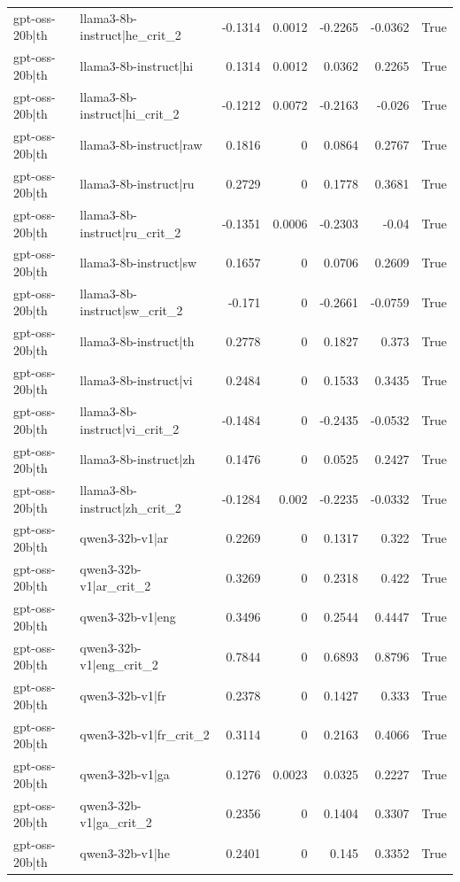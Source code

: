 \begin{table}
\begin{tabular}{l l r r r r l}
gpt-oss-20b|th & llama3-8b-instruct|he_crit_2 & -0.1314 & 0.0012 & -0.2265 & -0.0362 & True \\
gpt-oss-20b|th & llama3-8b-instruct|hi & 0.1314 & 0.0012 & 0.0362 & 0.2265 & True \\
gpt-oss-20b|th & llama3-8b-instruct|hi_crit_2 & -0.1212 & 0.0072 & -0.2163 & -0.026 & True \\
gpt-oss-20b|th & llama3-8b-instruct|raw & 0.1816 & 0 & 0.0864 & 0.2767 & True \\
gpt-oss-20b|th & llama3-8b-instruct|ru & 0.2729 & 0 & 0.1778 & 0.3681 & True \\
gpt-oss-20b|th & llama3-8b-instruct|ru_crit_2 & -0.1351 & 0.0006 & -0.2303 & -0.04 & True \\
gpt-oss-20b|th & llama3-8b-instruct|sw & 0.1657 & 0 & 0.0706 & 0.2609 & True \\
gpt-oss-20b|th & llama3-8b-instruct|sw_crit_2 & -0.171 & 0 & -0.2661 & -0.0759 & True \\
gpt-oss-20b|th & llama3-8b-instruct|th & 0.2778 & 0 & 0.1827 & 0.373 & True \\
gpt-oss-20b|th & llama3-8b-instruct|vi & 0.2484 & 0 & 0.1533 & 0.3435 & True \\
gpt-oss-20b|th & llama3-8b-instruct|vi_crit_2 & -0.1484 & 0 & -0.2435 & -0.0532 & True \\
gpt-oss-20b|th & llama3-8b-instruct|zh & 0.1476 & 0 & 0.0525 & 0.2427 & True \\
gpt-oss-20b|th & llama3-8b-instruct|zh_crit_2 & -0.1284 & 0.002 & -0.2235 & -0.0332 & True \\
gpt-oss-20b|th & qwen3-32b-v1|ar & 0.2269 & 0 & 0.1317 & 0.322 & True \\
gpt-oss-20b|th & qwen3-32b-v1|ar_crit_2 & 0.3269 & 0 & 0.2318 & 0.422 & True \\
gpt-oss-20b|th & qwen3-32b-v1|eng & 0.3496 & 0 & 0.2544 & 0.4447 & True \\
gpt-oss-20b|th & qwen3-32b-v1|eng_crit_2 & 0.7844 & 0 & 0.6893 & 0.8796 & True \\
gpt-oss-20b|th & qwen3-32b-v1|fr & 0.2378 & 0 & 0.1427 & 0.333 & True \\
gpt-oss-20b|th & qwen3-32b-v1|fr_crit_2 & 0.3114 & 0 & 0.2163 & 0.4066 & True \\
gpt-oss-20b|th & qwen3-32b-v1|ga & 0.1276 & 0.0023 & 0.0325 & 0.2227 & True \\
gpt-oss-20b|th & qwen3-32b-v1|ga_crit_2 & 0.2356 & 0 & 0.1404 & 0.3307 & True \\
gpt-oss-20b|th & qwen3-32b-v1|he & 0.2401 & 0 & 0.145 & 0.3352 & True \\

\end{tabular}
\end{table}
